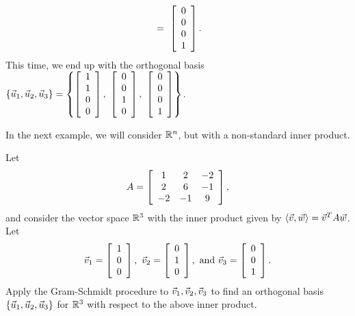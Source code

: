 \documentclass{ximera}
\begin{document}
\begin{solution}
\begin{eqnarray*}
    ~=~ \startmat{c} 0 \\ 0 \\ 0 \\ 1 \stopmat.
  \end{eqnarray*}
  This time, we end up with the orthogonal basis
  $\set{\vect{u}_1,\vect{u}_2,\vect{u}_3} = \set{
    \startmat{c} 1 \\ 1 \\ 0 \\ 0 \stopmat,~
    \startmat{c} 0 \\ 0 \\ 1 \\ 0 \stopmat,~
    \startmat{c} 0 \\ 0 \\ 0 \\ 1 \stopmat
  }$.
\end{solution}

In the next example, we will consider $\R^n$, but with a non-standard
inner product.

\begin{example}\label{ex:gram-schmidt-non-standard}
  Let
  \begin{equation*}
    A = \startmat{ccc}
      1 & 2 & -2 \\
      2 & 6 & -1 \\
      -2 & -1 & 9 \\
    \stopmat,
  \end{equation*}
  and consider the vector space $\R^3$ with the inner product given by
  $\iprod{\vect{v},\vect{w}} = \vect{v}^T A\vect{w}$.
  Let
  \begin{equation*}
    \vect{v}_1 = \startmat{c} 1 \\ 0 \\ 0 \stopmat,
    \quad
    \vect{v}_2 = \startmat{c} 0 \\ 1 \\ 0 \stopmat,
    \quad\mbox{and}\quad
    \vect{v}_3 = \startmat{c} 0 \\ 0 \\ 1 \stopmat.
  \end{equation*}
  Apply the Gram-Schmidt procedure to
  $\vect{v}_1,\vect{v}_2,\vect{v}_3$ to find an orthogonal basis
  $\set{\vect{u}_1,\vect{u}_2,\vect{u}_3}$ for $\R^3$ with respect to
  the above inner product.
\end{example}
\end{document}
